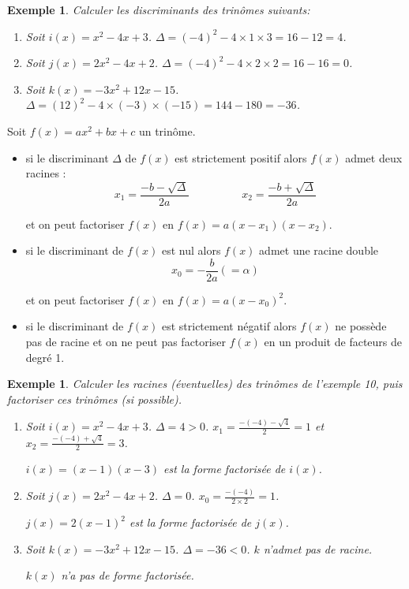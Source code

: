 \documentclass[a4paper,11pt]{article}
\theoremstyle{break}
\newcounter{enonce}
\newtheorem{exemple}[enonce]{Exemple}
\begin{document}
  \begin{exemple}
    
    Calculer les discriminants des trinômes suivants:
    \begin{enumerate}
     \item Soit $i(x)=x^2-4x+3$. $\Delta=(-4)^2-4 \times 1 \times 3=16-12=4$.
     \item Soit $j(x)=2x^2-4x+2$. $\Delta=(-4)^2-4 \times 2 \times 2=16-16=0$.
     \item Soit $k(x)=-3x^2+12x-15$. $\Delta=(12)^2-4 \times (-3) \times (-15)=144-180=-36$.
    \end{enumerate}
   \end{exemple}
  
  \begin{theorem}[Central]
    Soit $f(x)=ax^2+bx+c$ un trinôme.
    \begin{itemize}
     \item  si le discriminant $\Delta$ de $f(x)$ est strictement positif alors
     $f(x)$ admet deux racines :
     $$x_1=\frac{-b-\sqrt{\Delta}}{2a} \hspace{2cm} x_2=\frac{-b+\sqrt{\Delta}}{2a}$$
     
     et on peut factoriser $f(x)$ en $f(x)=a(x-x_1)(x-x_2)$.
     
     \item si le discriminant de $f(x)$ est nul alors $f(x)$ admet une racine double
     $$x_0=-\frac{b}{2a}(=\alpha)$$
     
     et on peut factoriser $f(x)$ en $f(x)=a(x-x_0)^2$.
     
     \item si le discriminant de $f(x)$ est strictement négatif alors
     $f(x)$ ne possède pas de racine et on ne peut pas factoriser $f(x)$ en un produit de facteurs de degré 1.
    \end{itemize}    
  \end{theorem}
  
  \begin{exemple}
    Calculer les racines (éventuelles) des trinômes de l'exemple 10, puis factoriser
    ces trinômes (si possible).
    
     \begin{enumerate}
     \item Soit $i(x)=x^2-4x+3$. $\Delta=4>0$. $x_1=\frac{-(-4)-\sqrt{4}}{2}=1$ et $x_2=\frac{-(-4)+\sqrt{4}}{2}=3$.
     
     $i(x)=(x-1)(x-3)$ est la forme factorisée de $i(x)$.
     \item Soit $j(x)=2x^2-4x+2$. $\Delta=0$. $x_0=\frac{-(-4)}{2 \times 2}=1$.
     
     $j(x)=2(x-1)^2$ est la forme factorisée de $j(x)$.
     \item Soit $k(x)=-3x^2+12x-15$. $\Delta=-36<0$. $k$ n'admet pas de racine.
     
     $k(x)$ n'a pas de forme factorisée.
    \end{enumerate}
   \end{exemple}
  
\end{document}
